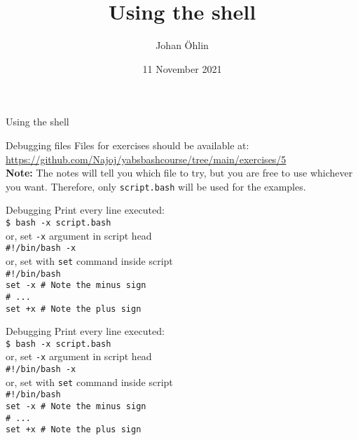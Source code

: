\documentclass{beamer}
\title{Using the shell}
\date{11 November 2021}
\author{Johan Öhlin}
\institute{Yabs}
\let\tt\texttt
\let\bf\textbf
\begin{document}
\begin{frame}{Using the shell}
\maketitle
\end{frame}

\begin{frame}{Debugging files}
    Files for exercises should be available at:    \\
    \url{https://github.com/Najoj/yabsbashcourse/tree/main/exercises/5} \\
    \bf{Note:} The notes will tell you which file to try, but you are free to use whichever you want. Therefore, only \tt{script.bash} will be used for the examples.
\end{frame}

\begin{frame}{Debugging}
    Print every line executed:      \\
    \tt{\$ bash -x script.bash}     \\
    or, set \tt{-x} argument in script head \\
    \tt{\#!/bin/bash -x}            \\
    or, set with \tt{set} command inside script \\
    \tt{\#!/bin/bash}               \\
    \tt{set -x  \# Note the minus sign} \\
    \tt{\# ...}                         \\
    \tt{set +x  \# Note the plus sign}  \\
\end{frame}

\begin{frame}{Debugging}
    Print every line executed:      \\
    \tt{\$ bash -x script.bash}     \\
    or, set \tt{-x} argument in script head \\
    \tt{\#!/bin/bash -x}            \\
    or, set with \tt{set} command inside script \\
    \tt{\#!/bin/bash}               \\
    \tt{set -x  \# Note the minus sign} \\
    \tt{\# ...}                         \\
    \tt{set +x  \# Note the plus sign}  \\
\end{frame}
\end{document}
